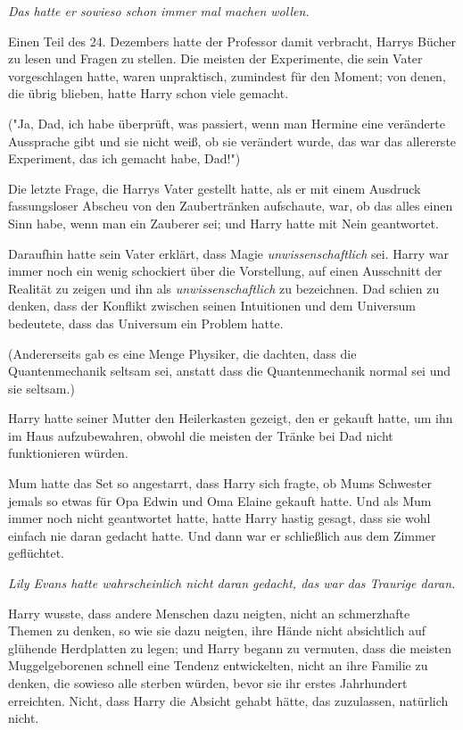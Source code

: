 {\emph{Das hatte er sowieso schon immer mal machen wollen.}

Einen Teil des 24. Dezembers hatte der Professor damit verbracht, Harrys Bücher zu lesen und Fragen zu stellen. Die meisten der Experimente, die sein Vater vorgeschlagen hatte, waren unpraktisch, zumindest für den Moment; von denen, die übrig blieben, hatte Harry schon viele gemacht.

("Ja, Dad, ich habe überprüft, was passiert, wenn man Hermine eine veränderte Aussprache gibt und sie nicht weiß, ob sie verändert wurde, das war das allererste Experiment, das ich gemacht habe, Dad!")

Die letzte Frage, die Harrys Vater gestellt hatte, als er mit einem Ausdruck fassungsloser Abscheu von den Zaubertränken aufschaute, war, ob das alles einen Sinn habe, wenn man ein Zauberer sei; und Harry hatte mit Nein geantwortet.

Daraufhin hatte sein Vater erklärt, dass Magie \emph{unwissenschaftlich} sei. Harry war immer noch ein wenig schockiert über die Vorstellung, auf einen Ausschnitt der Realität zu zeigen und ihn als \emph{unwissenschaftlich} zu bezeichnen. Dad schien zu denken, dass der Konflikt zwischen seinen Intuitionen und dem Universum bedeutete, dass das Universum ein Problem hatte.

(Andererseits gab es eine Menge Physiker, die dachten, dass die Quantenmechanik seltsam sei, anstatt dass die Quantenmechanik normal sei und sie seltsam.)

Harry hatte seiner Mutter den Heilerkasten gezeigt, den er gekauft hatte, um ihn im Haus aufzubewahren, obwohl die meisten der Tränke bei Dad nicht funktionieren würden.

Mum hatte das Set so angestarrt, dass Harry sich fragte, ob Mums Schwester jemals so etwas für Opa Edwin und Oma Elaine gekauft hatte. Und als Mum immer noch nicht geantwortet hatte, hatte Harry hastig gesagt, dass sie wohl einfach nie daran gedacht hatte. Und dann war er schließlich aus dem Zimmer geflüchtet.

\emph{Lily Evans hatte wahrscheinlich nicht daran gedacht, das war das Traurige daran.}

Harry wusste, dass andere Menschen dazu neigten, nicht an schmerzhafte Themen zu denken, so wie sie dazu neigten, ihre Hände nicht absichtlich auf glühende Herdplatten zu legen; und Harry begann zu vermuten, dass die meisten Muggelgeborenen schnell eine Tendenz entwickelten, nicht an ihre Familie zu denken, die sowieso alle sterben würden, bevor sie ihr erstes Jahrhundert erreichten. Nicht, dass Harry die Absicht gehabt hätte, das zuzulassen, natürlich nicht.

}
